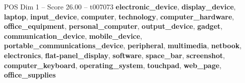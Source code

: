 \begin{textsample}{POS Dim 1 – Score 26.00 – t007073}  \label{ex:f1_pos_025}
\textbf{electronic\_device}, \textbf{display\_device}, \textbf{laptop}, \textbf{input\_device}, \textbf{computer}, \textbf{technology}, \textbf{computer\_hardware}, \textbf{office\_equipment}, \textbf{personal\_computer}, \textbf{output\_device}, \textbf{gadget}, \textbf{communication\_device}, \textbf{mobile\_device}, \textbf{portable\_communications\_device}, \textbf{peripheral}, \textbf{multimedia}, \textbf{netbook}, \textbf{electronics}, \textbf{flat-panel\_display}, \textbf{software}, \textbf{space\_bar}, \textbf{screenshot}, \textbf{computer\_keyboard}, \textbf{operating\_system}, \textbf{touchpad}, \textbf{web\_page}, \textbf{office\_supplies}

\end{textsample}
